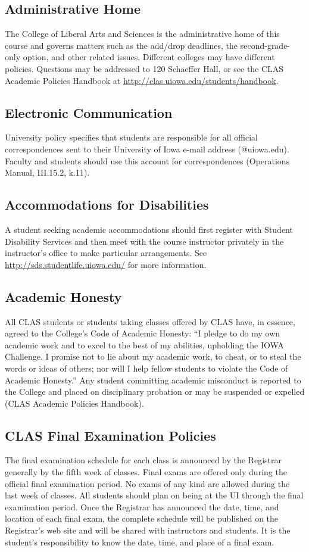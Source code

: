\documentclass[10pt]{article}
\begin{document}
\subsection*{Administrative Home}
The College of Liberal Arts and Sciences is the administrative home of this
course and governs matters such as the add/drop deadlines, the
second-grade-only option, and other related issues. Different colleges may have
different policies. Questions may be addressed to 120 Schaeffer Hall, or see
the CLAS Academic Policies Handbook at
\url{http://clas.uiowa.edu/students/handbook}.

\subsection*{Electronic Communication}
University policy specifies that students are responsible for all official
correspondences sent to their University of Iowa e-mail address (@uiowa.edu).
Faculty and students should use this account for correspondences (Operations
Manual, III.15.2, k.11).

\subsection*{Accommodations for Disabilities}
A student seeking academic accommodations should first register with Student
Disability Services and then meet with the course instructor privately in the
instructor's office to make particular arrangements. See
\url{http://sds.studentlife.uiowa.edu/} for more information.

\subsection*{Academic Honesty}
All CLAS students or students taking classes offered by CLAS have, in essence,
agreed to the College's Code of Academic Honesty: ``I pledge to do my own
academic work and to excel to the best of my abilities, upholding the IOWA
Challenge. I promise not to lie about my academic work, to cheat, or to steal
the words or ideas of others; nor will I help fellow students to violate the
Code of Academic Honesty.'' Any student committing academic misconduct is
reported to the College and placed on disciplinary probation or may be
suspended or expelled (CLAS Academic Policies Handbook).

\subsection*{CLAS Final Examination Policies}
The final examination schedule for each class is announced by the Registrar
generally by the fifth week of classes. Final exams are offered only during the
official final examination period. No exams of any kind are allowed during the
last week of classes. All students should plan on being at the UI through the
final examination period. Once the Registrar has announced the date, time, and
location of each final exam, the complete schedule will be published on the
Registrar's web site and will be shared with instructors and students. It is
the student's responsibility to know the date, time, and place of a final exam.
\end{document}
